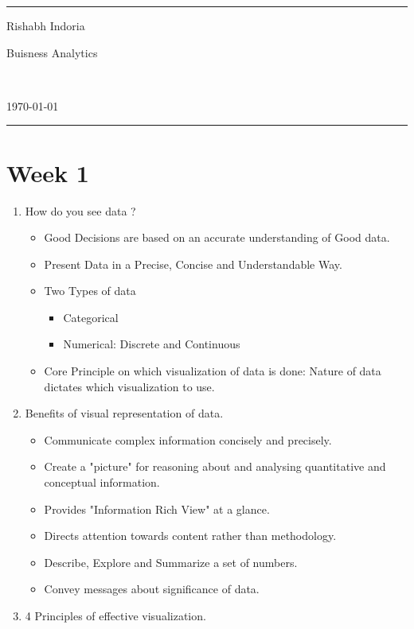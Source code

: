\documentclass[a4paper]{article}
\begin{document}
\fancyhead[c]{}
\hrule \medskip
\begin{minipage}{0.295\textwidth}
\raggedright
Rishabh Indoria
\end{minipage}
\begin{minipage}{0.4\textwidth}
\centering
\LARGE
Buisness Analytics
\end{minipage}\
\begin{minipage}{0.295\textwidth}
\raggedleft
\today \hfill \\
\end{minipage}
\medskip \hrule
\bigskip

\section{Week 1}
	\begin{enumerate}
		\item How do you see data ?
		\begin{itemize}
			\item Good Decisions are based on an accurate understanding of Good data.
			\item Present Data in a Precise, Concise and Understandable Way.
			\item Two Types of data
			\begin{itemize}
				\item Categorical
				\item Numerical: Discrete and Continuous
			\end{itemize}
		\item Core Principle on which visualization of data is done: Nature of data dictates which visualization to use.
		\end{itemize}
		\item Benefits of visual representation of data.
		\begin{itemize}
			\item Communicate complex information concisely and precisely.
			\item Create a "picture" for reasoning about and analysing quantitative and conceptual information.
			\item Provides "Information Rich View" at a glance.
			\item Directs attention towards content rather than methodology.
			\item Describe, Explore and Summarize a set of numbers.
			\item Convey messages about significance of data.
		\end{itemize}
		\item 4 Principles of effective visualization.

\end{enumerate}
\end{document}
